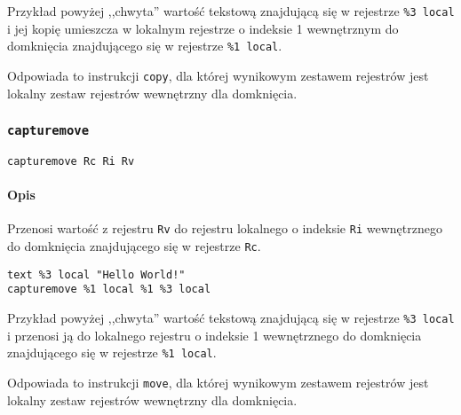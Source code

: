 Przykład powyżej ,,chwyta'' wartość tekstową znajdującą się w rejestrze
\texttt{\%3~local} i jej kopię umieszcza w lokalnym rejestrze o indeksie 1
wewnętrznym do domknięcia znajdującego się w rejestrze \texttt{\%1~local}.

Odpowiada to instrukcji \texttt{copy}, dla której wynikowym zestawem rejestrów
jest lokalny zestaw rejestrów wewnętrzny dla domknięcia.

\subsubsection{\texttt{capturemove}}

\begin{lstlisting}
capturemove Rc Ri Rv
\end{lstlisting}

\paragraph*{Opis} Przenosi wartość z rejestru \texttt{Rv} do rejestru lokalnego
o indeksie \texttt{Ri} wewnętrznego do domknięcia znajdującego się w rejestrze
\texttt{Rc}.
\begin{lstlisting}
text %3 local "Hello World!"
capturemove %1 local %1 %3 local
\end{lstlisting}

Przykład powyżej ,,chwyta'' wartość tekstową znajdującą się w rejestrze
\texttt{\%3~local} i przenosi ją do lokalnego rejestru o indeksie 1
wewnętrznego do domknięcia znajdującego się w rejestrze \texttt{\%1~local}.

Odpowiada to instrukcji \texttt{move}, dla której wynikowym zestawem rejestrów
jest lokalny zestaw rejestrów wewnętrzny dla domknięcia.
